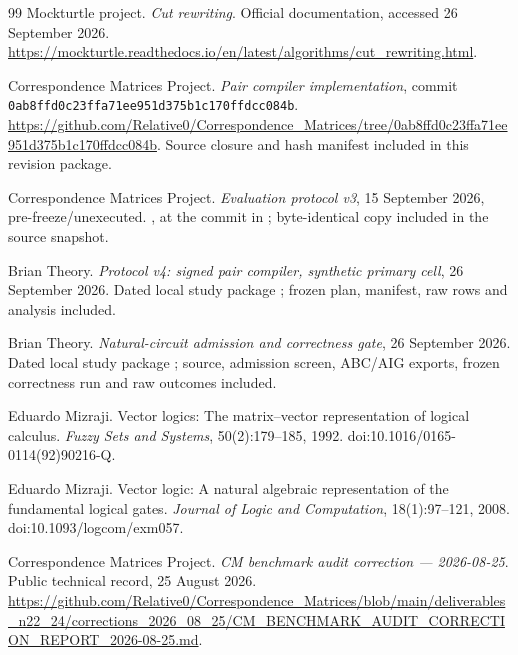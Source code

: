 \documentclass[10pt]{article}
\theoremstyle{plain}
\theoremstyle{definition}
\theoremstyle{remark}
\begin{document}
\begin{thebibliography}{99}
Mockturtle project.
\newblock \emph{Cut rewriting}.
\newblock Official documentation, accessed 26 September 2026.
\newblock \url{https://mockturtle.readthedocs.io/en/latest/algorithms/cut_rewriting.html}.

Correspondence Matrices Project.
\newblock \emph{Pair compiler implementation}, commit \texttt{0ab8ffd0c23ffa71ee951d375b1c170ffdcc084b}.
\newblock \url{https://github.com/Relative0/Correspondence_Matrices/tree/0ab8ffd0c23ffa71ee951d375b1c170ffdcc084b}.
\newblock Source closure and hash manifest included in this revision package.

Correspondence Matrices Project.
\newblock \emph{Evaluation protocol v3}, 15 September 2026, pre-freeze/unexecuted.
\newblock {}, at the commit in \cite{CompilerSnapshot2026}; byte-identical copy included in the source snapshot.

Brian Theory.
\newblock \emph{Protocol v4: signed pair compiler, synthetic primary cell}, 26 September 2026.
\newblock Dated local study package ; frozen plan, manifest, raw rows and analysis included.

Brian Theory.
\newblock \emph{Natural-circuit admission and correctness gate}, 26 September 2026.
\newblock Dated local study package ; source, admission screen, ABC/AIG exports, frozen correctness run and raw outcomes included.

Eduardo Mizraji.
\newblock Vector logics: The matrix--vector representation of logical calculus.
\newblock \emph{Fuzzy Sets and Systems}, 50(2):179--185, 1992.
\newblock doi:10.1016/0165-0114(92)90216-Q.

Eduardo Mizraji.
\newblock Vector logic: A natural algebraic representation of the fundamental logical gates.
\newblock \emph{Journal of Logic and Computation}, 18(1):97--121, 2008.
\newblock doi:10.1093/logcom/exm057.

Correspondence Matrices Project.
\newblock \emph{CM benchmark audit correction --- 2026-08-25}.
\newblock Public technical record, 25 August 2026.
\newblock \url{https://github.com/Relative0/Correspondence_Matrices/blob/main/deliverables_n22_24/corrections_2026_08_25/CM_BENCHMARK_AUDIT_CORRECTION_REPORT_2026-08-25.md}.


\end{thebibliography}
\end{document}
